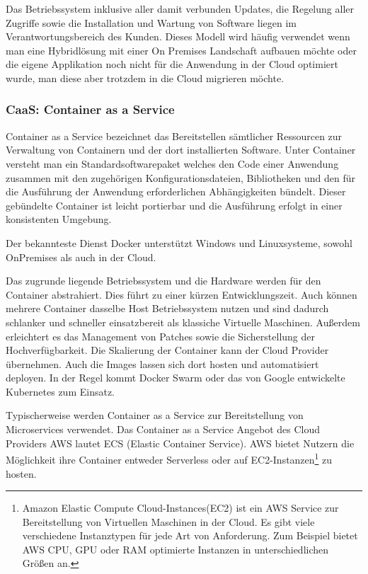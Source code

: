   Das Betriebssystem inklusive aller damit verbunden Updates, die Regelung aller Zugriffe sowie die Installation
   und Wartung von Software liegen im Verantwortungsbereich des Kunden.
   Dieses Modell wird häufig verwendet wenn man eine Hybridlösung mit einer On Premises Landschaft aufbauen möchte oder die eigene Applikation
   noch nicht für die Anwendung in der Cloud optimiert wurde, man diese aber trotzdem in die Cloud migrieren möchte.\cite[]{CloudComputingDef}

   \subsubsection{CaaS: Container as a Service}
   Container as a Service bezeichnet das Bereitstellen sämtlicher Ressourcen zur Verwaltung von Containern und der dort installierten Software.
   Unter Container versteht man ein {}\glqq Standardsoftwarepaket \grqq{} welches {}\glqq den Code einer Anwendung zusammen mit den zugehörigen Konfigurationsdateien,
   Bibliotheken und den für die Ausführung der Anwendung erforderlichen Abhängigkeiten \grqq{} bündelt. \cite[]{CaaS}
   Dieser gebündelte Container ist leicht portierbar und die Ausführung erfolgt in einer konsistenten Umgebung.

   Der bekannteste Dienst Docker unterstützt Windows und Linuxsysteme, sowohl OnPremises als auch in der Cloud.

   Das zugrunde liegende Betriebssystem und die Hardware werden für den Container abstrahiert. Dies führt zu einer kürzen Entwicklungszeit.
   Auch können mehrere Container dasselbe Host Betriebssystem nutzen und sind dadurch schlanker und schneller einsatzbereit als klassiche Virtuelle Maschinen.
   Außerdem erleichtert es das Management von Patches sowie die Sicherstellung der Hochverfügbarkeit.
   Die Skalierung der Container kann der Cloud Provider übernehmen. Auch die Images lassen sich dort hosten und automatisiert deployen.
   In der Regel kommt Docker Swarm oder das von Google entwickelte Kubernetes zum Einsatz.

   Typischerweise werden Container as a Service zur Bereitstellung von Microservices
   verwendet. Das Container as a Service Angebot des Cloud Providers AWS lautet ECS (Elastic Container Service).
   AWS bietet Nutzern die Möglichkeit ihre Container entweder Serverless oder auf EC2-Instanzen\footnote{Amazon Elastic Compute Cloud-Instances(EC2) ist ein AWS Service
   zur Bereitstellung von Virtuellen Maschinen in der Cloud. Es gibt viele verschiedene Instanztypen für jede Art von Anforderung.
   Zum Beispiel bietet AWS CPU, GPU oder RAM optimierte Instanzen in unterschiedlichen Größen an. } zu hosten. \cite[]{AWSECS}

